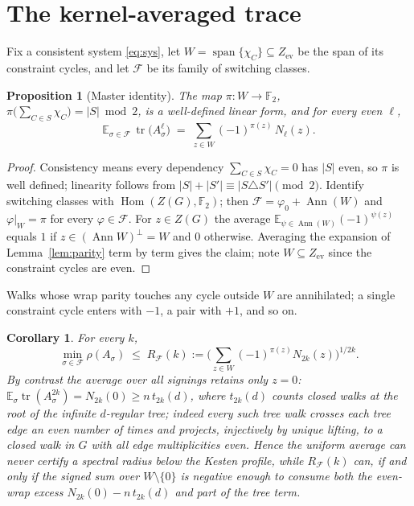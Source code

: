 \documentclass[11pt]{article}
\newtheorem{proposition}[lemma]{Proposition}
\newtheorem{corollary}[lemma]{Corollary}
\theoremstyle{remark}
\newcommand{\F}{\mathbb{F}}
\newcommand{\Ze}{Z_{\mathrm{ev}}}
\newcommand{\rhomax}{\rho}
\DeclareMathOperator{\tr}{tr}
\begin{document}
\section{The kernel-averaged trace}\label{sec:kernel}

Fix a consistent system \eqref{eq:sys}, let
$W=\operatorname{span}\{\chi_C\}\subseteq\Ze$ be the span of its
constraint cycles, and let $\mathcal F$ be its family of switching
classes.

\begin{proposition}[Master identity]\label{prop:master}
The map $\pi\colon W\to\F_2$,
$\pi\big(\sum_{C\in S}\chi_C\big)=|S|\bmod2$, is a well-defined linear
form, and for every even $\ell$,
\[
\mathbb E_{\sigma\in\mathcal F}\,\tr\!\big(A_\sigma^{\ell}\big)
\;=\;\sum_{z\in W}(-1)^{\pi(z)}\,N_\ell(z).
\]
\end{proposition}

\begin{proof}
Consistency means every dependency $\sum_{C\in S}\chi_C=0$ has $|S|$
even, so $\pi$ is well defined; linearity follows from
$|S|+|S'|\equiv|S\triangle S'|\pmod2$. Identify switching classes with
$\operatorname{Hom}(Z(G),\F_2)$; then
$\mathcal F=\varphi_0+\operatorname{Ann}(W)$ and $\varphi|_W=\pi$ for
every $\varphi\in\mathcal F$. For $z\in Z(G)$ the average
$\mathbb E_{\psi\in\operatorname{Ann}(W)}(-1)^{\psi(z)}$ equals $1$ if
$z\in(\operatorname{Ann}W)^{\perp}=W$ and $0$ otherwise. Averaging the
expansion of Lemma~\ref{lem:parity} term by term gives the claim; note
$W\subseteq\Ze$ since the constraint cycles are even.
\end{proof}

Walks whose wrap parity touches any cycle outside $W$ are annihilated;
a single constraint cycle enters with $-1$, a pair with $+1$, and so on.

\begin{corollary}\label{cor:certificate}
For every $k$,
\[
\min_{\sigma\in\mathcal F}\rhomax(A_\sigma)\;\le\;
R_{\mathcal F}(k):=\Big(\sum_{z\in W}(-1)^{\pi(z)}N_{2k}(z)\Big)^{1/2k}.
\]
By contrast the average over all signings retains only $z=0$:
$\mathbb E_\sigma\tr(A_\sigma^{2k})=N_{2k}(0)\ge n\,t_{2k}(d)$, where
$t_{2k}(d)$ counts closed walks at the root of the infinite $d$-regular
tree; indeed every such tree walk crosses each tree edge an even number
of times and projects, injectively by unique lifting, to a closed walk
in $G$ with all edge multiplicities even. Hence the uniform average can
never certify a spectral radius below the Kesten profile, while
$R_{\mathcal F}(k)$ can, if and only if the signed sum over
$W\setminus\{0\}$ is negative enough to consume both the even-wrap
excess $N_{2k}(0)-n\,t_{2k}(d)$ and part of the tree term.
\end{corollary}
\end{document}
